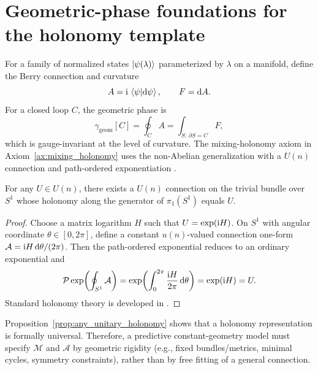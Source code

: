 \section{Geometric-phase foundations for the holonomy template}
\label{app:holonomy}

For a family of normalized states $\ket{\psi(\lambda)}$ parameterized by $\lambda$ on a manifold, define the Berry connection and curvature \cite{Simon1983,Berry1984,Nakahara2003}
\begin{equation}
A = \mathrm{i}\,\braket{\psi|\mathrm{d}\psi},\qquad F=\mathrm{d} A.
\end{equation}
For a closed loop $C$, the geometric phase is
\begin{equation}
\gamma_{\mathrm{geom}}[C]=\oint_C A = \int_{S:\,\partial S=C} F,
\end{equation}
which is gauge-invariant at the level of curvature. The mixing-holonomy axiom in Axiom~\ref{ax:mixing_holonomy} uses the non-Abelian generalization with a $U(n)$ connection and path-ordered exponentiation \cite{WilczekZee1984,Nakahara2003}.

\begin{proposition}
\label{prop:any_unitary_holonomy}
For any $U\in U(n)$, there exists a $U(n)$ connection on the trivial bundle over $S^1$ whose holonomy along the generator of $\pi_1(S^1)$ equals $U$.
\end{proposition}
\begin{proof}
Choose a matrix logarithm $H$ such that $U=\exp(\mathrm{i} H)$. On $S^1$ with angular coordinate $\theta\in[0,2\pi]$, define a constant $u(n)$-valued connection one-form $\mathcal{A}=\mathrm{i} H\,\mathrm{d}\theta/(2\pi)$. Then the path-ordered exponential reduces to an ordinary exponential and
\[
\mathcal{P}\exp\!\left(\oint_{S^1} \mathcal{A}\right)=\exp\!\left(\int_0^{2\pi} \frac{\mathrm{i} H}{2\pi}\,\mathrm{d}\theta\right)=\exp(\mathrm{i} H)=U.
\]
Standard holonomy theory is developed in \cite{KobayashiNomizu1963}.
\end{proof}

\begin{remark}
\label{rem:holonomy_rigidity}
Proposition~\ref{prop:any_unitary_holonomy} shows that a holonomy representation is formally universal. Therefore, a predictive constant-geometry model must specify $\mathcal{M}$ and $\mathcal{A}$ by geometric rigidity (e.g., fixed bundles/metrics, minimal cycles, symmetry constraints), rather than by free fitting of a general connection.
\end{remark}
